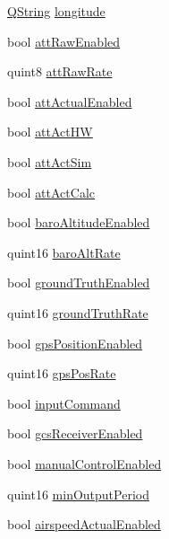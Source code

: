 \begin{DoxyCompactItemize}
\item 
\hyperlink{group___u_a_v_objects_plugin_gab9d252f49c333c94a72f97ce3105a32d}{Q\-String} \hyperlink{group___h_i_t_l_plugin_gac60d13c120d3dd97309688a1d7f3d6d7}{longitude}
\item 
bool \hyperlink{group___h_i_t_l_plugin_ga003958320fd5c963c5d2ddff60ffd28b}{att\-Raw\-Enabled}
\item 
quint8 \hyperlink{group___h_i_t_l_plugin_ga70d4f6a60b23f4545d46ff7dfe4c710e}{att\-Raw\-Rate}
\item 
bool \hyperlink{group___h_i_t_l_plugin_ga9b02793b3d0effcdb43df1d5e20012fd}{att\-Actual\-Enabled}
\item 
bool \hyperlink{group___h_i_t_l_plugin_ga4e0f8f54388f25df1142b8f895a4b445}{att\-Act\-H\-W}
\item 
bool \hyperlink{group___h_i_t_l_plugin_ga8620f5c9256ac5988861939a70fde264}{att\-Act\-Sim}
\item 
bool \hyperlink{group___h_i_t_l_plugin_gab40adc150ae79f115f2680cdf131b41d}{att\-Act\-Calc}
\item 
bool \hyperlink{group___h_i_t_l_plugin_ga6700d3be0f4ef9211d6f34569034b7a8}{baro\-Altitude\-Enabled}
\item 
quint16 \hyperlink{group___h_i_t_l_plugin_gab5b66abe21b9a0f00b2dc2bbb28cac6c}{baro\-Alt\-Rate}
\item 
bool \hyperlink{group___h_i_t_l_plugin_ga7da92539dd2e9e4aeb94b848dc464b11}{ground\-Truth\-Enabled}
\item 
quint16 \hyperlink{group___h_i_t_l_plugin_ga46aa73f7e222771afe3b547bca31eacb}{ground\-Truth\-Rate}
\item 
bool \hyperlink{group___h_i_t_l_plugin_gaec1f5b5cc3ce18186907fde4c9c990b3}{gps\-Position\-Enabled}
\item 
quint16 \hyperlink{group___h_i_t_l_plugin_ga2904afd635e416ec6fca4b3b6bb8679f}{gps\-Pos\-Rate}
\item 
bool \hyperlink{group___h_i_t_l_plugin_gaef59cc30b3dc3c996cfba35065d250bd}{input\-Command}
\item 
bool \hyperlink{group___h_i_t_l_plugin_ga2e4de2a270dafeeadda687a7fc6fb817}{gcs\-Receiver\-Enabled}
\item 
bool \hyperlink{group___h_i_t_l_plugin_gac67de1b6ac74a48c592f55fd17e06ad8}{manual\-Control\-Enabled}
\item 
quint16 \hyperlink{group___h_i_t_l_plugin_ga11d8608f07438f05d1950aa62f774d0c}{min\-Output\-Period}
\item 
bool \hyperlink{group___h_i_t_l_plugin_ga8fc341e96193fe41625a04a534a16387}{airspeed\-Actual\-Enabled}

\end{DoxyCompactItemize}
